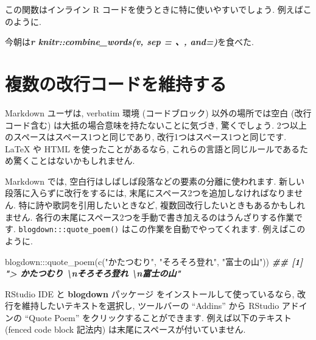 \documentclass[
  11pt,
]{bxjsreport}
\newenvironment{Shaded}{\begin{snugshade}}{\end{snugshade}}
\newcommand{\DocumentationTok}[1]{\textcolor[rgb]{0.56,0.35,0.01}{\textbf{\textit{#1}}}}
\newcommand{\FunctionTok}[1]{\textcolor[rgb]{0.00,0.00,0.00}{#1}}
\newcommand{\InformationTok}[1]{\textcolor[rgb]{0.56,0.35,0.01}{\textbf{\textit{#1}}}}
\newcommand{\NormalTok}[1]{#1}
\newcommand{\SpecialCharTok}[1]{\textcolor[rgb]{0.00,0.00,0.00}{#1}}
\newcommand{\StringTok}[1]{\textcolor[rgb]{0.31,0.60,0.02}{#1}}
\begin{document}
この関数はインライン R コードを使うときに特に使いやすいでしょう. 例えばこのように.

\begin{Shaded}
\begin{Highlighting}[]
\NormalTok{今朝は}\InformationTok{\textasciigrave{}r knitr::combine\_words(v, sep = \textquotesingle{}、\textquotesingle{}, and=\textquotesingle{}\textquotesingle{})\textasciigrave{}}\NormalTok{を食べた.}
\end{Highlighting}
\end{Shaded}

\hypertarget{linebreaks}{%
\section{複数の改行コードを維持する}\label{linebreaks}}

Markdown ユーザは, verbatim 環境 (コードブロック) 以外の場所では空白 (改行コード含む) は大抵の場合意味を持たないことに気づき, 驚くでしょう. 2つ以上のスペースはスペース1つと同じであり, 改行1つはスペース1つと同じです. LaTeX や HTML を使ったことがあるなら, これらの言語と同じルールであるため驚くことはないかもしれません.

Markdown では, 空白行はしばしば段落などの要素の分離に使われます. 新しい段落に入らずに改行をするには, 末尾にスペース2つを追加しなければなりません. 特に詩や歌詞を引用したいときなど, 複数回改行したいときもあるかもしれません. 各行の末尾にスペース2つを手動で書き加えるのはうんざりする作業です. \texttt{blogdown:::quote\_poem()} はこの作業を自動でやってくれます. 例えばこのように.

\begin{Shaded}
\begin{Highlighting}[numbers=left,,]
\NormalTok{blogdown}\SpecialCharTok{:::}\FunctionTok{quote\_poem}\NormalTok{(}\FunctionTok{c}\NormalTok{(}\StringTok{"かたつむり"}\NormalTok{, }\StringTok{"そろそろ登れ"}\NormalTok{, }
  \StringTok{"富士の山"}\NormalTok{))}
\DocumentationTok{\#\# [1] "\textgreater{} かたつむり  \textbackslash{}nそろそろ登れ  \textbackslash{}n富士の山"}
\end{Highlighting}
\end{Shaded}

RStudio IDE と \textbf{blogdown} パッケージ \autocite{R-blogdown} をインストールして使っているなら, 改行を維持したいテキストを選択し, ツールバーの ``Addins'' から RStudio アドインの ``Quote Poem'' をクリックすることができます. 例えば以下のテキスト (fenced code block 記法内) は末尾にスペースが付いていません.
\end{document}
